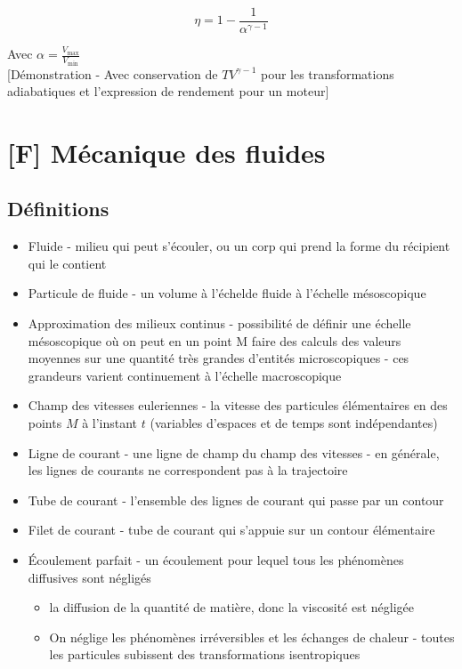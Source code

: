 \documentclass[openany]{book}
\begin{document}
\[ \eta = 1 - \frac{1}{\alpha^{\gamma - 1}} \]

Avec $\alpha = \frac{V_{\max}}{V_{\min}}$ \\

[Démonstration - Avec conservation de $TV^{\gamma - 1}$ pour les transformations adiabatiques et l'expression de rendement pour un moteur]

\clearpage

\chapter{[F] Mécanique des fluides}

\section{Définitions}
\begin{itemize}
    \item Fluide - milieu qui peut s'écouler, ou un corp qui prend la forme du récipient qui le contient
    \item Particule de fluide - un volume à l'échelde fluide à l'échelle mésoscopique
    \item Approximation des milieux continus - possibilité de définir une échelle mésoscopique où on peut en un point M faire des calculs des valeurs moyennes sur une quantité très grandes d'entités microscopiques - ces grandeurs varient continuement à l'échelle macroscopique
    \item Champ des vitesses euleriennes - la vitesse des particules élémentaires en des points $M$ à l'instant $t$ (variables d'espaces et de temps sont indépendantes)
    \item Ligne de courant - une ligne de champ du champ des vitesses - en générale, les lignes de courants ne correspondent pas à la trajectoire
    \item Tube de courant - l'ensemble des lignes de courant qui passe par un contour
    \item Filet de courant - tube de courant qui s'appuie sur un contour élémentaire
    \item Écoulement parfait - un écoulement pour lequel tous les phénomènes diffusives sont négligés
    \begin{itemize}
        \item la diffusion de la quantité de matière, donc la viscosité est négligée
        \item On néglige les phénomènes irréversibles et les échanges de chaleur - toutes les particules subissent des transformations isentropiques
    \end{itemize}
\end{itemize}
\end{document}

